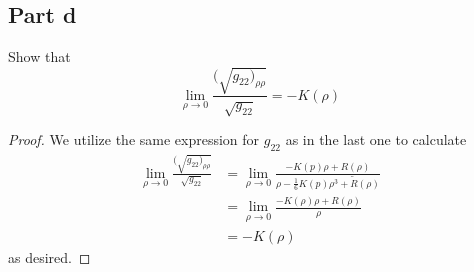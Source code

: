 \documentclass[fontsize=11pt]{scrartcl} %
\numberwithin{equation}{section} %
\numberwithin{figure}{section} %
\numberwithin{table}{section} %
\begin{document}
\subsection*{Part d}
Show that 
\[
    \lim_{\rho\to 0} \frac{(\sqrt{g_{22})_{\rho\rho}}}{\sqrt{g_{22}}} = -K(\rho)
\]
\begin{proof}
    We utilize the same expression for $g_{22}$ as in the last one to calculate
    \[
\begin{aligned}
    \lim_{\rho\to 0} \frac{(\sqrt{g_{22})_{\rho\rho}}}{\sqrt{g_{22}}}
    &= \lim_{\rho\to 0}\frac{-K(p)\rho + R(\rho)}{\rho-\frac{1}{6}K(p)\rho^3 +
            \tilde{R}(\rho)}\\
            &=\lim_{\rho\to 0} \frac{-K(\rho)\rho + R(\rho)}{\rho}\\
            &=-K(\rho)
\end{aligned}
    \]
    as desired.
\end{proof}
\end{document}
